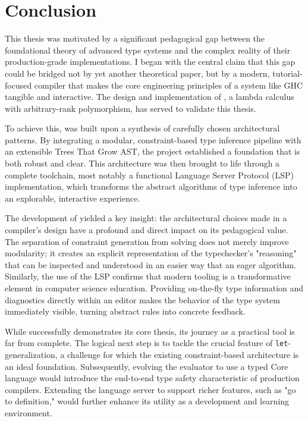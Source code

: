 \chapter{Conclusion}
\label{chap:Conclusion}

This thesis was motivated by a significant pedagogical gap between the foundational theory of advanced type systems and the complex reality of their production-grade implementations. I began with the central claim that this gap could be bridged not by yet another theoretical paper, but by a modern, tutorial-focused compiler that makes the core engineering principles of a system like GHC tangible and interactive. The design and implementation of \Arralac, a lambda calculus with arbitrary-rank polymorphism, has served to validate this thesis.

To achieve this, \Arralac was built upon a synthesis of carefully chosen architectural patterns. By integrating a modular, constraint-based type inference pipeline with an extensible Trees That Grow AST, the project established a foundation that is both robust and clear. This architecture was then brought to life through a complete toolchain, most notably a functional Language Server Protocol (LSP) implementation, which transforms the abstract algorithms of type inference into an explorable, interactive experience.

The development of \Arralac yielded a key insight: the architectural choices made in a compiler's design have a profound and direct impact on its pedagogical value. The separation of constraint generation from solving does not merely improve modularity; it creates an explicit representation of the typechecker's "reasoning" that can be inspected and understood in an easier way that an eager algorithm. Similarly, the use of the LSP confirms that modern tooling is a transformative element in computer science education. Providing on-the-fly type information and diagnostics directly within an editor makes the behavior of the type system immediately visible, turning abstract rules into concrete feedback.

While \Arralac successfully demonstrates its core thesis, its journey as a practical tool is far from complete. The logical next step is to tackle the crucial feature of \texttt{let}-generalization, a challenge for which the existing constraint-based architecture is an ideal foundation. Subsequently, evolving the evaluator to use a typed Core language would introduce the end-to-end type safety characteristic of production compilers. Extending the language server to support richer features, such as "go to definition," would further enhance its utility as a development and learning environment.


